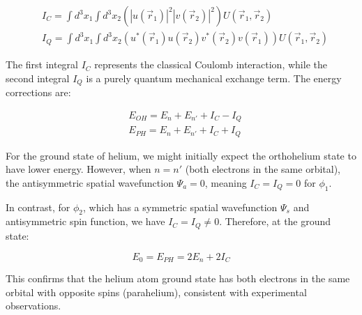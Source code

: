 \begin{align}
&I_C=\int d^3x_1\int d^3x_2(|u(\vec{r}_1)|^2|v(\vec{r}_2)|^2)U(\vec{r}_1,\vec{r}_2)\\
&I_Q=\int d^3x_1\int d^3x_2(u^*(\vec{r}_1)u(\vec{r}_2)v^*(\vec{r}_2)v(\vec{r}_1))U(\vec{r}_1,\vec{r}_2)
\end{align}

The first integral $I_C$ represents the classical Coulomb interaction, while the second integral $I_Q$ is a purely quantum mechanical exchange term. The energy corrections are:

\begin{align}
&E_{OH}=E_n+E_{n'}+I_C-I_Q\\
&E_{PH}=E_n+E_{n'}+I_C+I_Q
\end{align}


For the ground state of helium, we might initially expect the orthohelium state to have lower energy. However, when $n=n'$ (both electrons in the same orbital), the antisymmetric spatial wavefunction $\Psi_a=0$, meaning $I_C=I_Q=0$ for $\phi_1$.

In contrast, for $\phi_2$, which has a symmetric spatial wavefunction $\Psi_s$ and antisymmetric spin function, we have $I_C=I_Q\neq 0$. Therefore, at the ground state:

\begin{equation}
E_0=E_{PH}=2E_n+2I_C
\end{equation}

This confirms that the helium atom ground state has both electrons in the same orbital with opposite spins (parahelium), consistent with experimental observations.

